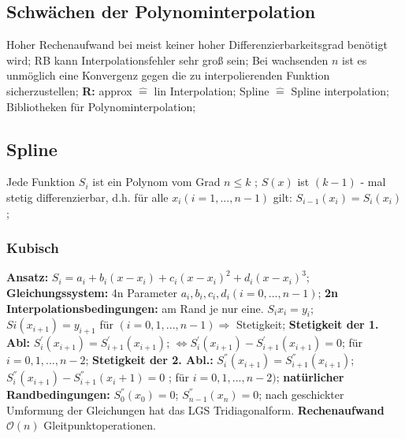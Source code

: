 \subsection{Schwächen der Polynominterpolation}
Hoher Rechenaufwand bei meist keiner hoher Differenzierbarkeitsgrad benötigt wird; RB kann Interpolationsfehler sehr groß sein; Bei wachsenden $n$ ist es unmöglich eine Konvergenz gegen die zu interpolierenden Funktion sicherzustellen;
\textbf{R:} 
approx $\hat{=}$ lin Interpolation; 
Spline $\hat{=}$ Spline interpolation; 
Bibliotheken für Polynominterpolation;
\subsection{Spline}
Jede Funktion $ S_{i} $ ist ein Polynom vom Grad  $ n \le k $ ; 
$ S(x) $ ist $ ( k -1 ) $ - mal stetig differenzierbar, d.h. für alle $ x_{i} ( i = 1, ..., n-1 ) $ gilt: $ S_{ i-1 } ( x_{ i } ) = S_{ i } ( x_{i} ) $; 
\subsubsection{Kubisch}
\textbf{Ansatz:} $ S_{ i } = a_{ i } + b_{ i } ( x- x_{ i } ) + c_{ i } (x-x_{i})^{2} + d_{i} (x-x_{i})^{3}$; 
\textbf{Gleichungssystem:} 4n Parameter $ a_{i}, b_{i}, c_{i}, d_{i} ( i=0, ..., n-1) $; 
\textbf{2n Interpolationsbedingungen:} am Rand je nur eine. $ S_{i} x_{i} = y_{i}$; 
$ Si (x_{i+1}) = y_{i+1}$ für $  ( i= 0, 1, ..., n-1) \Rightarrow $ Stetigkeit; 
\textbf{Stetigkeit der 1. Abl:} 
$ S_{i}^{'} (x_{i+1}) = S_{i+1}^{'}(x_{i+1}) $; 
$ \Leftrightarrow S_{i}^{'}(x_{i+1}) - S_{i+1}^{'} ( x_{i+1}) = 0 $; 
für $ i = 0, 1, ..., n-2 $; 
\textbf{Stetigkeit der 2. Abl.:} 
$ S_{i}^{''} (x_{i+1}) = S_{i+1}^{''} (x_{i+1}) $; 
$ S_{i}^{''}(x_{i+1}) - S_{i+1}^{''}(x_{i}+1) = 0 $ ; für $ i=0,1,...,n-2) $; 
\textbf{natürlicher Randbedingungen:}
$ S_{0}^{''}(x_{0}) = 0 $; 
$ S_{n-1}^{''}(x_{n}) = 0 $; 
nach geschickter Umformung der Gleichungen hat das LGS Tridiagonalform. 
\textbf{Rechenaufwand} $ \mathcal O ( n ) $ Gleitpunktoperationen.

